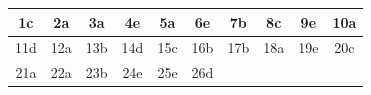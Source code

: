 \begin{enumerate}
\begin{center}
\begin{tabular}{|c|c|c|c|c|c|c|c|c|c|}
\hline
1c & 2a & 3a & 4e & 5a & 6e & 7b & 8c & 9e & 10a\\
\hline
11d & 12a & 13b & 14d & 15c & 16b & 17b & 18a & 19e & 20c\\
\hline
21a & 22a & 23b & 24e & 25e & 26d & & & & \\
\hline
\end{tabular}
\end{center}
\end{enumerate}



